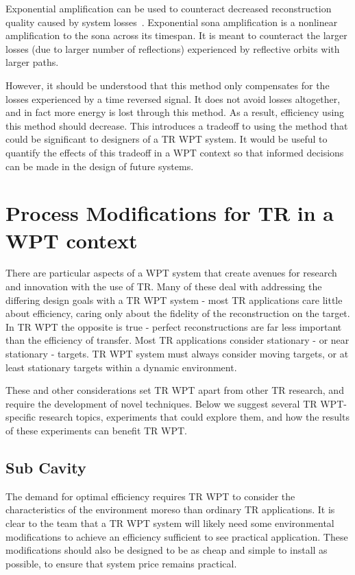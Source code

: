Exponential amplification can be used to counteract decreased reconstruction quality caused by system losses~\cite{bini-thesis}. Exponential sona amplification is a nonlinear amplification to the sona across its timespan. It is meant to counteract the larger losses (due to larger number of reflections) experienced by reflective orbits with larger paths.

However, it should be understood that this method only compensates for the losses experienced by a time reversed signal. It does not avoid losses altogether, and in fact more energy is lost through this method. As a result, efficiency using this method should decrease. This introduces a tradeoff to using the method that could be significant to designers of a TR WPT system. It would be useful to quantify the effects of this tradeoff in a WPT context so that informed decisions can be made in the design of future systems.

\section{Process Modifications for TR in a WPT context}
\label{sec:future-wpt}

There are particular aspects of a WPT system that create avenues for research and innovation with the use of TR. Many of these deal with addressing the differing design goals with a TR WPT system - most TR applications care little about efficiency, caring only about the fidelity of the reconstruction on the target. In TR WPT the opposite is true - perfect reconstructions are far less important than the efficiency of transfer. Most TR applications consider stationary - or near stationary - targets. TR WPT system must always consider moving targets, or at least stationary targets within a dynamic environment.

These and other considerations set TR WPT apart from other TR research, and require the development of novel techniques. Below we suggest several TR WPT-specific research topics, experiments that could explore them, and how the results of these experiments can benefit TR WPT.

\subsection{Sub Cavity}

The demand for optimal efficiency requires TR WPT to consider the characteristics of the environment moreso than ordinary TR applications. It is clear to the team that a TR WPT system will likely need some environmental modifications to achieve an efficiency sufficient to see practical application. These modifications should also be designed to be as cheap and simple to install as possible, to ensure that system price remains practical.

